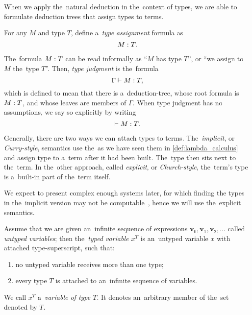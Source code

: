 
When we apply the~natural deduction in the~context of types, we are able to
formulate deduction trees that assign types to terms.

\begin{definition}
  For any \lt $M$ and type $T$, define a~\emph{type assignment} formula as
  \[
    M \overset{}: T.
  \]
\end{definition}

The~formula $M \overset{}: T$ can be read informally as ``$M$ has type $T$'', or ``we
assign to $M$ the~type $T$''. Then, \emph{type judgment} is the~formula
\[
  \Gamma \vdash M \overset{}: T,
\]
which is defined to mean that there is a~deduction-tree, whose root formula is
$M \overset{}: T$, and whose leaves are members of $\Gamma$. When type judgment has no
assumptions, we say so explicitly by writing
\[
  \vdash M \overset{}: T.
\]

\label{sec:stlc}

Generally, there are two ways we can attach types to terms. The~\emph{implicit},
or \emph{Curry-style}, semantics use the~\lts as we have seen them in
\autoref{def:lambda_calculus} and assign type to a~term after it had been built.
The~type then sits next to the~term. In the~other approach, called
\emph{explicit}, or \emph{Church-style}, the~term's type is a~built-in part of
the~term itself.

We expect to present complex enough systems later, for which finding the types
in the~implicit version may not be computable~\citep{wells_1999}, hence we will
use the~explicit semantics.

\begin{definition}
  Assume that we are given an~infinite sequence of expressions $\mathbf{v}_0,
  \mathbf{v}_1, \mathbf{v}_2, \dots$ called \emph{untyped variables}; then
  the~\emph{typed variable $x^T$} is an~untyped variable $x$ with attached
  type-superscript, such that:
  \begin{enumerate}
    \item \label{def:typed_var:a_item} no untyped variable receives more than
      one type;
    \item \label{def:typed_var:b_item} every type $T$ is attached to an~infinite
      sequence of variables.
  \end{enumerate}
\end{definition}
We call $x^T$ a~\emph{variable of type $T$}. It denotes an~arbitrary member of
the~set denoted by $T$.

